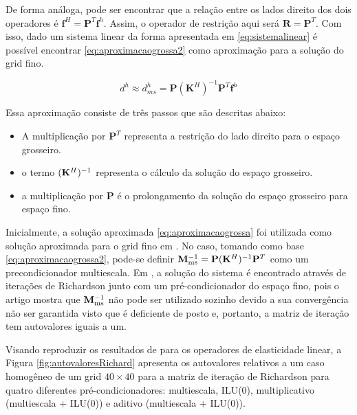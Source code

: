 De forma análoga, pode ser encontrar que a relação entre os lados direito dos dois operadores é $\mathbf{f}^H = \mathbf{P}^T \mathbf{f}^h$. Assim, o operador de restrição aqui será $\mathbf{R} = \mathbf{P}^T$. Com isso, dado um sistema linear da forma apresentada em \eqref{eq:sistemalinear} é possível encontrar \eqref{eq:aproximacaogrossa2} como aproximação para a solução do grid fino.

\begin{equation} \label{eq:aproximacaogrossa2}
    d^h \approx d^h_{ms} = \mathbf{P} (\mathbf{K}^H)^{-1} \mathbf{P}^{T} \mathbf{f}^h
\end{equation}

Essa aproximação consiste de três passos que são descritas abaixo:

\begin{itemize}
    \item A multiplicação por $\mathbf{P}^T$ representa a restrição do lado direito para o espaço grosseiro.
    \item  o termo $(\mathbf{K}^H)^{-1}$ representa o cálculo da solução do espaço grosseiro.
    \item a multiplicação por $\mathbf{P}$ é o prolongamento da solução do espaço grosseiro para espaço fino.
\end{itemize}


Inicialmente, a solução aproximada \eqref{eq:aproximacaogrossa} foi utilizada como solução aproximada para o grid fino em \cite{thomashou}. No caso, tomando como base \eqref{eq:aproximacaogrossa2}, pode-se definir $\mathbf{M}^{-1}_{\text{ms}} = \mathbf{P} (\mathbf{K}^H)^{-1} \mathbf{P}^{T}$ como um precondicionador multiescala. Em \citet{zhouiterativo}, a solução do sistema é encontrado através de iterações de Richardson junto com um pré-condicionador do espaço fino, pois o artigo mostra que $\mathbf{M}^{-1}_{\text{ms}}$ não pode ser utilizado sozinho devido a sua convergência não ser garantida visto que  é deficiente de posto e, portanto, a matriz de iteração tem autovalores iguais a um.   

Visando reproduzir os resultados de \cite{zhouiterativo} para os operadores de elasticidade linear, a Figura \ref{fig:autovaloresRichard} apresenta os autovalores relativos a um caso homogêneo de um grid $40\times40$ para a matriz de iteração de Richardson para quatro diferentes pré-condicionadores: multiescala, ILU(0), multiplicativo (multiescala + ILU(0)) e aditivo (multiescala + ILU(0)).


